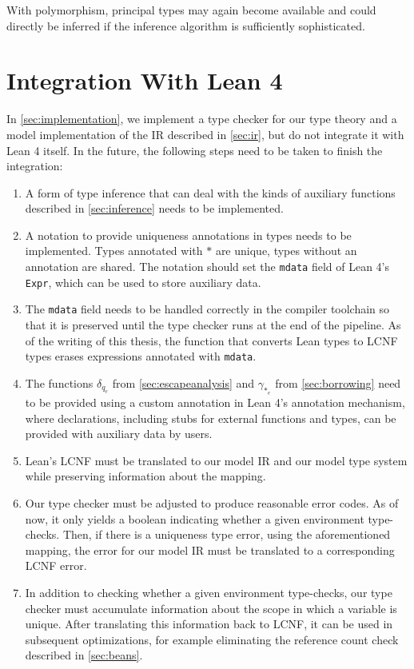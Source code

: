 With polymorphism, principal types may again become available and could directly be inferred if the inference algorithm is sufficiently sophisticated.

\section{Integration With Lean 4}
In \cref{sec:implementation}, we implement a type checker for our type theory and a model implementation of the IR described in \cref{sec:ir}, but do not integrate it with Lean 4 itself. In the future, the following steps need to be taken to finish the integration:
\begin{enumerate}
	\item A form of type inference that can deal with the kinds of auxiliary functions described in \cref{sec:inference} needs to be implemented.
	\item A notation to provide uniqueness annotations in types needs to be implemented. Types annotated with $*$ are unique, types without an annotation are shared. The notation should set the \lstinline|mdata| field of Lean 4's \lstinline|Expr|, which can be used to store auxiliary data.
	\item The \lstinline|mdata| field needs to be handled correctly in the compiler toolchain so that it is preserved until the type checker runs at the end of the pipeline. As of the writing of this thesis, the function that converts Lean types to LCNF types erases expressions annotated with \lstinline|mdata|.
	\item The functions $\delta_{q_e}$ from \cref{sec:escapeanalysis} and $\gamma_{*_e}$ from \cref{sec:borrowing} need to be provided using a custom annotation in Lean 4's annotation mechanism, where declarations, including stubs for external functions and types, can be provided with auxiliary data by users.
	\item Lean's LCNF must be translated to our model IR and our model type system while preserving information about the mapping.
	\item Our type checker must be adjusted to produce reasonable error codes. As of now, it only yields a boolean indicating whether a given environment type-checks. Then, if there is a uniqueness type error, using the aforementioned mapping, the error for our model IR must be translated to a corresponding LCNF error.
	\item In addition to checking whether a given environment type-checks, our type checker must accumulate information about the scope in which a variable is unique. After translating this information back to LCNF, it can be used in subsequent optimizations, for example eliminating the reference count check described in \cref{sec:beans}.
\end{enumerate}

